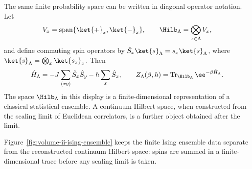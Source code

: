 The same finite probability space can be written in diagonal operator notation.
Let
\[
  V_x=\operatorname{span}\{\ket{+}_x,\ket{-}_x\},
  \qquad
  \Hilb_\Lambda=\bigotimes_{x\in\Lambda}V_x ,
\]
and define commuting spin operators by
\(\hat S_x\ket{s}_\Lambda=s_x\ket{s}_\Lambda\), where
\(\ket{s}_\Lambda=\bigotimes_x\ket{s_x}_x\).  Then
\[
  \hat H_\Lambda
  =
  -J\sum_{\langle x y\rangle}\hat S_x\hat S_y
  -h\sum_x\hat S_x,
  \qquad
  Z_\Lambda(\beta,h)
  =
  \operatorname{Tr}_{\Hilb_\Lambda}\ee^{-\beta\hat H_\Lambda}.
\]
The space \(\Hilb_\Lambda\) in this display is a finite-dimensional
representation of a classical statistical ensemble.  A continuum Hilbert space,
when constructed from the scaling limit of Euclidean correlators, is a further
object obtained after the limit.

Figure~\ref{fig:volume-ii-ising-ensemble} keeps the finite Ising ensemble data
separate from the reconstructed continuum Hilbert space: spins are summed in a
finite-dimensional trace before any scaling limit is taken.

